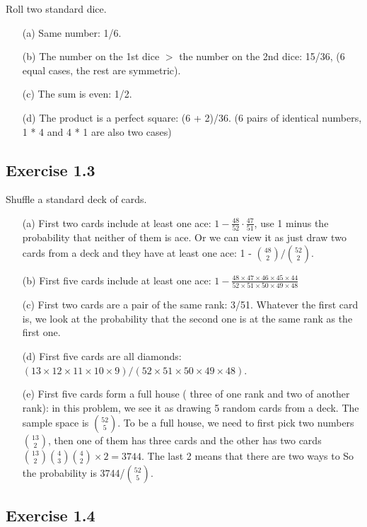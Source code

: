 Roll two standard dice.

\begin{itemize}
	\item[(a)] Same number: 1/6.
	\item[(b)] The number on the 1st dice $>$ the number on the 2nd dice: 15/36, (6 equal cases, the rest are symmetric).
	\item[(c)] The sum is even: 1/2.
	\item[(d)] The product is a perfect square: (6 + 2)/36. (6 pairs of identical numbers, 1 * 4 and 4 * 1 are also two cases)
\end{itemize}


\subsection*{Exercise 1.3}

Shuffle a standard deck of cards.

\begin{itemize}
	\item[(a)] First two cards include at least one ace: $1 - \frac{48}{52} \cdot \frac{47}{51}$, use 1 minus the probability
	that neither of them is ace. Or we can view it as just draw two cards from a deck and they have at least one ace: 
	1 - $\binom{48}{2}/\binom{52}{2}$.
	\item[(b)] First five cards include at least one ace: 
	$1 - \frac{48 \times 47 \times 46 \times 45 \times 44}{52 \times 51 \times 50 \times 49 \times 48}$
	\item[(c)] First two cards are a pair of the same rank: 3/51. Whatever the first card is, we look at the probability that the second one is at the same rank as the first one.
	\item[(d)] First five cards are all diamonds: $(13 \times 12 \times 11 \times 10 \times 9)/(52 \times 51 \times 50 \times 49 \times 48)$.
	\item[(e)] First five cards form a full house ( three of one rank and two of another rank):
	in this problem, we see it as drawing 5 random cards from a deck. The sample space is $\binom{52}{5}$. To be a full house, we need to
	first pick two numbers $\binom{13}{2}$, then one of them has three cards and the other has two cards $\binom{13}{2}\binom{4}{3} \binom{4}{2} \times 2 = 3744$. The last 2 means that there are two ways to 
	So the probability is 3744/$\binom{52}{5}$.
\end{itemize}

\subsection*{Exercise 1.4}

